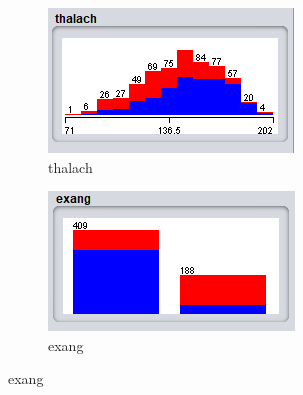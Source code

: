 \begin{figure}[H]
\medskip
\begin{subfigure}{0.38\textwidth}
  \includegraphics[width=\linewidth]{2/10.png}
  \caption{thalach}
  \label{fig:4}
\end{subfigure}\hfil %
\begin{subfigure}{0.38\textwidth}
  \includegraphics[width=\linewidth]{2/11.png}
  \caption{exang}
  \label{fig:6}
\end{subfigure}


\end{figure}
